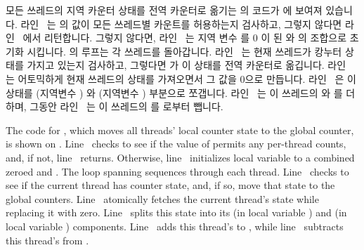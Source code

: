 \begin{fcvref}
모든 쓰레드의 지역 카운터 상태를 전역 카운터로 옮기는 
의 코드가  에 보여져 있습니다.
라인~ 는  의 값이 모든 쓰레드별 카운트를
허용하는지 검사하고, 그렇지 않다면 라인~ 에서 리턴합니다.
그렇지 않다면, 라인~ 는 지역 변수  를 0 이 된
 와  의 조합으로 초기화 시킵니다.
 의 루프는 각 쓰레드를 돌아갑니다.
라인~ 는 현재 쓰레드가 캉누터 상태를 가지고 있는지 검사하고,
그렇다면  가 이 상태를 전역 카운터로 옮깁니다.
라인~ 는 어토믹하게 현재 쓰레드의 상태를 가져오면서 그 값을
0으로 만듭니다.
라인~ 은 이 상태를  (지역변수 ) 와
 (지역변수 ) 부분으로 쪼갭니다.
라인~ 는 이 쓰레드의  와  를 더하며,
그동안 라인~ 는 이 쓰레드의  를 
로부터 뺍니다.
\end{fcvref}

\iffalse

\begin{fcvref}
The code for , which moves all threads' local
counter state to the global counter, is shown on
.
Line~ checks to see if the value of
 permits
any per-thread counts, and, if not, line~ returns.
Otherwise, line~ initializes local variable  to a combined
zeroed  and .
The loop spanning  sequences
through each thread.
Line~ checks to see if the current thread has counter state,
and, if so,  move that state
to the global counters.
Line~ atomically fetches the current thread's state
while replacing it with zero.
Line~ splits this state into its 
(in local variable )
and  (in local variable ) components.
Line~ adds this thread's  to , while
line~ subtracts this thread's  from .
\end{fcvref}

